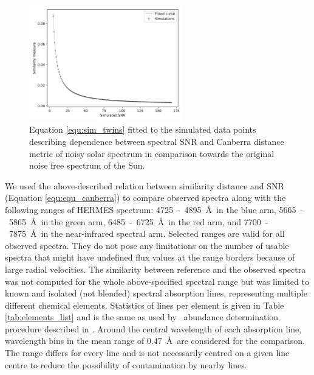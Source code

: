 \begin{figure}
	\centering
	\includegraphics[width=0.6\textwidth]{canberra_b2_flux0_05.png}
	\caption{Equation \ref{equ:sim_twins} fitted to the simulated data points describing dependence between spectral SNR and Canberra distance metric of noisy solar spectrum in comparison towards the original noise free spectrum of the Sun.}
	\label{fig:similarity_snr_twins}
\end{figure}

We used the above-described relation between similarity distance and SNR (Equation \ref{equ:equ_canberra}) to compare observed spectra along with the following ranges of HERMES spectrum: 4725~-~4895~\AA\ in the blue arm, 5665~-~5865~\AA\ in the green arm, 6485~-~6725~\AA\ in the red arm, and 7700~-~7875~\AA\ in the near-infrared spectral arm. Selected ranges are valid for all observed spectra. They do not pose any limitations on the number of usable spectra that might have undefined flux values at the range borders because of large radial velocities. The similarity between reference and the observed spectra was not computed for the whole above-specified spectral range but was limited to known and isolated (not blended) spectral absorption lines, representing multiple different chemical elements. Statistics of lines per element is given in Table \ref{tab:elements_list} and is the same as used by \TC\ abundance determination procedure described in \citet{buder2018}. Around the central wavelength of each absorption line, wavelength bins in the mean range of $0.47$~\AA\ are considered for the comparison. The range differs for every line and is not necessarily centred on a given line centre \cite{buder2018} to reduce the possibility of contamination by nearby lines.

